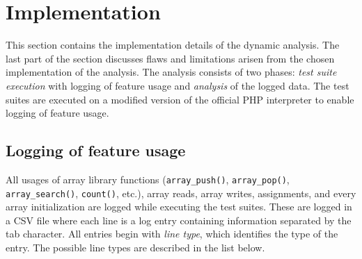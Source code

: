 \section{Implementation}
\label{sec:studyImplementation}
This section contains the implementation details of the dynamic analysis. The last part of the section discusses flaws and limitations arisen from the chosen implementation of the analysis. The analysis consists of two phases: \textit{test suite execution} with logging of feature usage and \textit{analysis} of the logged data. The test suites are executed on a modified version of the official PHP interpreter to enable logging of feature usage.

\subsection{Logging of feature usage}
All usages of array library functions (\texttt{array\_push()}, \texttt{array\_pop()}, \texttt{array\_search()}, \texttt{count()}, etc.), array reads, array writes, assignments, and every array initialization are logged while executing the test suites. These are logged in a CSV file where each line is a log entry containing information separated by the tab character. All entries begin with  \emph{line type}, which identifies the type of the entry. The possible line types are described in the list below.

